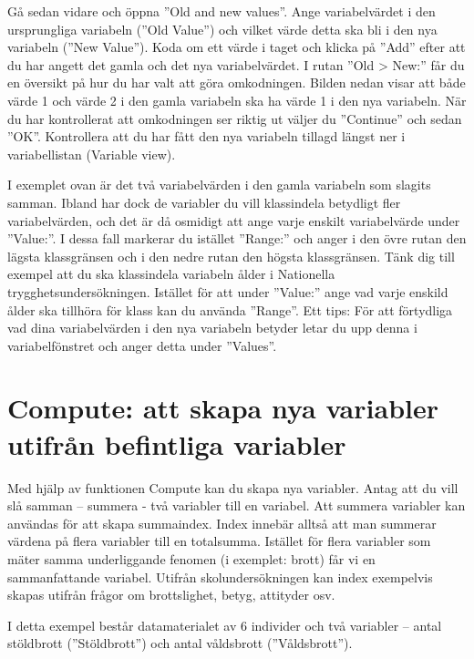 \documentclass[
]{book}
\begin{document}
Gå sedan vidare och öppna ''Old and new values''. Ange variabelvärdet i den ursprungliga variabeln
(''Old Value'') och vilket värde detta ska bli i den nya variabeln (''New Value''). Koda om ett värde i
taget och klicka på ''Add'' efter att du har angett det gamla och det nya variabelvärdet. I rutan ''Old \textgreater{} New:''
får du en översikt på hur du har valt att göra omkodningen. Bilden nedan visar att både
värde 1 och värde 2 i den gamla variabeln ska ha värde 1 i den nya variabeln. När du har
kontrollerat att omkodningen ser riktig ut väljer du ''Continue'' och sedan ''OK''. Kontrollera att du
har fått den nya variabeln tillagd längst ner i variabellistan (Variable view).

I exemplet ovan är det två variabelvärden i den gamla variabeln som slagits samman. Ibland har dock de
variabler du vill klassindela betydligt fler variabelvärden, och det är då osmidigt att ange varje enskilt
variabelvärde under ''Value:''. I dessa fall markerar du istället ''Range:'' och anger i den övre rutan den
lägsta klassgränsen och i den nedre rutan den högsta klassgränsen. Tänk dig till exempel att du ska
klassindela variabeln ålder i Nationella trygghetsundersökningen. Istället för att under ''Value:'' ange
vad varje enskild ålder ska tillhöra för klass kan du använda ''Range''. Ett tips: För att förtydliga vad dina
variabelvärden i den nya variabeln betyder letar du upp denna i variabelfönstret och anger detta under
''Values''.

\hypertarget{compute-att-skapa-nya-variabler-utifruxe5n-befintliga-variabler}{%
\section{Compute: att skapa nya variabler utifrån befintliga variabler}\label{compute-att-skapa-nya-variabler-utifruxe5n-befintliga-variabler}}

Med hjälp av funktionen Compute kan du skapa nya variabler. Antag att du vill slå samman -- summera -
två variabler till en variabel. Att summera variabler kan användas för att skapa summaindex. Index
innebär alltså att man summerar värdena på flera variabler till en totalsumma. Istället för flera variabler
som mäter samma underliggande fenomen (i exemplet: brott) får vi en sammanfattande variabel.
Utifrån skolundersökningen kan index exempelvis skapas utifrån frågor om brottslighet, betyg, attityder
osv.

I detta exempel består datamaterialet av 6 individer och två variabler -- antal stöldbrott (''Stöldbrott'')
och antal våldsbrott (''Våldsbrott'').
\end{document}
